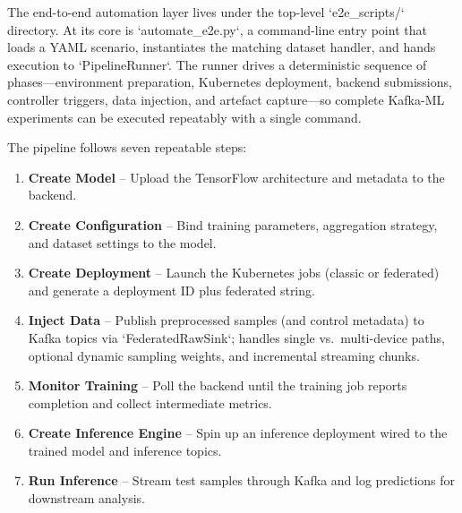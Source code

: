 The end-to-end automation layer lives under the top-level `e2e\_scripts/` directory. At its core is `automate\_e2e.py`, a command-line entry point that loads a YAML scenario, instantiates the matching dataset handler, and hands execution to `PipelineRunner`. The runner drives a deterministic sequence of phases—environment preparation, Kubernetes deployment, backend submissions, controller triggers, data injection, and artefact capture—so complete Kafka-ML experiments can be executed repeatably with a single command.

\noindent The pipeline follows seven repeatable steps:
\begin{enumerate}
    \item \textbf{Create Model} – Upload the TensorFlow architecture and metadata to the backend.
    \item \textbf{Create Configuration} – Bind training parameters, aggregation strategy, and dataset settings to the model.
    \item \textbf{Create Deployment} – Launch the Kubernetes jobs (classic or federated) and generate a deployment ID plus federated string.
    \item \textbf{Inject Data} – Publish preprocessed samples (and control metadata) to Kafka topics via `FederatedRawSink`; handles single vs.~multi-device paths, optional dynamic sampling weights, and incremental streaming chunks.
    \item \textbf{Monitor Training} – Poll the backend until the training job reports completion and collect intermediate metrics.
    \item \textbf{Create Inference Engine} – Spin up an inference deployment wired to the trained model and inference topics.
    \item \textbf{Run Inference} – Stream test samples through Kafka and log predictions for downstream analysis.
\end{enumerate}

